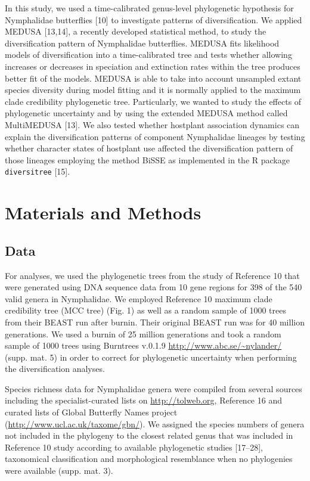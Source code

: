 \documentclass[10pt]{article}
\begin{document}
In this study, we used a time-calibrated genus-level phylogenetic
hypothesis for Nymphalidae butterflies {[}10{]} to investigate patterns
of diversification. We applied MEDUSA {[}13,14{]}, a recently developed
statistical method, to study the diversification pattern of Nymphalidae
butterflies. MEDUSA fits likelihood models of diversification into a
time-calibrated tree and tests whether allowing increases or decreases
in speciation and extinction rates within the tree produces better fit
of the models. MEDUSA is able to take into account unsampled extant
species diversity during model fitting and it is normally applied to the
maximum clade credibility phylogenetic tree. Particularly, we wanted to
study the effects of phylogenetic uncertainty and by using the extended
MEDUSA method called MultiMEDUSA {[}13{]}. We also tested whether
hostplant association dynamics can explain the diversification patterns
of component Nymphalidae lineages by testing whether character states of
hostplant use affected the diversification pattern of those lineages
employing the method BiSSE as implemented in the R package
\texttt{diversitree} {[}15{]}.

\section*{Materials and Methods}

\subsection*{Data}

For analyses, we used the phylogenetic trees from the study of Reference
10 that were generated using DNA sequence data from 10 gene regions for
398 of the 540 valid genera in Nymphalidae. We employed Reference 10
maximum clade credibility tree (MCC tree) (Fig. 1) as well as a random
sample of 1000 trees from their BEAST run after burnin. Their original
BEAST run was for 40 million generations. We used a burnin of 25 million
generations and took a random sample of 1000 trees using Burntrees
v.0.1.9 \url{http://www.abc.se/~nylander/} (supp. mat. 5) in order to
correct for phylogenetic uncertainty when performing the diversification
analyses.

Species richness data for Nymphalidae genera were compiled from several
sources including the specialist-curated lists on
\url{http://tolweb.org}, Reference 16 and curated lists of Global
Butterfly Names project (\url{http://www.ucl.ac.uk/taxome/gbn/}). We
assigned the species numbers of genera not included in the phylogeny to
the closest related genus that was included in Reference 10 study
according to available phylogenetic studies {[}17--28{]}, taxonomical
classification and morphological resemblance when no phylogenies were
available (supp. mat. 3).
\end{document}
